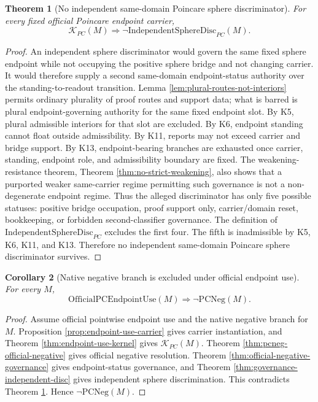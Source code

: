 \documentclass[11pt]{article}
\newtheorem{theorem}{Theorem}[section]
\newtheorem{corollary}[theorem]{Corollary}
\newcommand{\KPC}{\mathcal{K}_{PC}}
\newcommand{\OfficialPCEndpointUse}{\mathrm{OfficialPCEndpointUse}}
\newcommand{\PCNeg}{\mathrm{PCNeg}}
\newcommand{\IndependentSphereDisc}{\mathrm{IndependentSphereDisc}_{PC}}
\begin{document}
\begin{theorem}[No independent same-domain Poincare sphere discriminator]\label{thm:no-independent-sphere-disc}
For every fixed official Poincare endpoint carrier,
\[
\KPC(M)\Rightarrow\neg\IndependentSphereDisc(M).
\]
\end{theorem}
\begin{proof}
An independent sphere discriminator would govern the same fixed sphere endpoint while not occupying the positive sphere bridge and not changing carrier. It would therefore supply a second same-domain endpoint-status authority over the standing-to-readout transition. Lemma \ref{lem:plural-routes-not-interiors} permits ordinary plurality of proof routes and support data; what is barred is plural endpoint-governing authority for the same fixed endpoint slot. By K5, plural admissible interiors for that slot are excluded. By K6, endpoint standing cannot float outside admissibility. By K11, reports may not exceed carrier and bridge support. By K13, endpoint-bearing branches are exhausted once carrier, standing, endpoint role, and admissibility boundary are fixed. The weakening-resistance theorem, Theorem \ref{thm:no-strict-weakening}, also shows that a purported weaker same-carrier regime permitting such governance is not a non-degenerate endpoint regime. Thus the alleged discriminator has only five possible statuses: positive bridge occupation, proof support only, carrier/domain reset, bookkeeping, or forbidden second-classifier governance. The definition of \(\IndependentSphereDisc\) excludes the first four. The fifth is inadmissible by K5, K6, K11, and K13. Therefore no independent same-domain Poincare sphere discriminator survives.
\end{proof}

\begin{corollary}[Native negative branch is excluded under official endpoint use]\label{cor:pcneg-excluded}
For every \(M\),
\[
\OfficialPCEndpointUse(M)\Rightarrow\neg\PCNeg(M).
\]
\end{corollary}
\begin{proof}
Assume official pointwise endpoint use and the native negative branch for \(M\). Proposition \ref{prop:endpoint-use-carrier} gives carrier instantiation, and Theorem \ref{thm:endpoint-use-kernel} gives \(\KPC(M)\). Theorem \ref{thm:pcneg-official-negative} gives official negative resolution. Theorem \ref{thm:official-negative-governance} gives endpoint-status governance, and Theorem \ref{thm:governance-independent-disc} gives independent sphere discrimination. This contradicts Theorem \ref{thm:no-independent-sphere-disc}. Hence \(\neg\PCNeg(M)\).
\end{proof}
\end{document}
